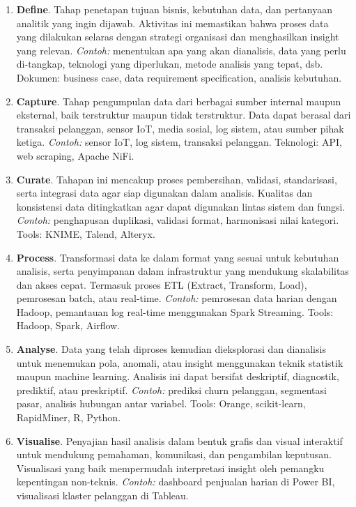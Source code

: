 \begin{enumerate}
	\item \textbf{Define}. Tahap penetapan tujuan bisnis, kebutuhan data, dan pertanyaan analitik yang ingin dijawab. Aktivitas ini memastikan bahwa proses data yang dilakukan selaras dengan strategi organisasi dan menghasilkan insight yang relevan. \textit{Contoh:} menentukan apa yang akan dianalisis, data yang perlu di-tangkap, teknologi yang diperlukan, metode analisis yang tepat, dsb. Dokumen: business case, data requirement specification, analisis kebutuhan.
	
	\item \textbf{Capture}. Tahap pengumpulan data dari berbagai sumber internal maupun eksternal, baik terstruktur maupun tidak terstruktur. Data dapat berasal dari transaksi pelanggan, sensor IoT, media sosial, log sistem, atau sumber pihak ketiga. \textit{Contoh:} sensor IoT, log sistem, transaksi pelanggan. Teknologi: API, web scraping, Apache NiFi.
	
	\item \textbf{Curate}. Tahapan ini mencakup proses pembersihan, validasi, standarisasi, serta integrasi data agar siap digunakan dalam analisis. Kualitas dan konsistensi data ditingkatkan agar dapat digunakan lintas sistem dan fungsi. \textit{Contoh:} penghapusan duplikasi, validasi format, harmonisasi nilai kategori. Tools: KNIME, Talend, Alteryx.
	
	\item \textbf{Process}. Transformasi data ke dalam format yang sesuai untuk kebutuhan analisis, serta penyimpanan dalam infrastruktur yang mendukung skalabilitas dan akses cepat. Termasuk proses ETL (Extract, Transform, Load), pemrosesan batch, atau real-time. \textit{Contoh:} pemrosesan data harian dengan Hadoop, pemantauan log real-time menggunakan Spark Streaming. Tools: Hadoop, Spark, Airflow.
	
	\item \textbf{Analyse}. Data yang telah diproses kemudian dieksplorasi dan dianalisis untuk menemukan pola, anomali, atau insight menggunakan teknik statistik maupun machine learning. Analisis ini dapat bersifat deskriptif, diagnostik, prediktif, atau preskriptif. \textit{Contoh:} prediksi churn pelanggan, segmentasi pasar, analisis hubungan antar variabel. Tools: Orange, scikit-learn, RapidMiner, R, Python.
	
	\item \textbf{Visualise}. Penyajian hasil analisis dalam bentuk grafis dan visual interaktif untuk mendukung pemahaman, komunikasi, dan pengambilan keputusan. Visualisasi yang baik mempermudah interpretasi insight oleh pemangku kepentingan non-teknis. \textit{Contoh:} dashboard penjualan harian di Power BI, visualisasi klaster pelanggan di Tableau.
	

\end{enumerate}
